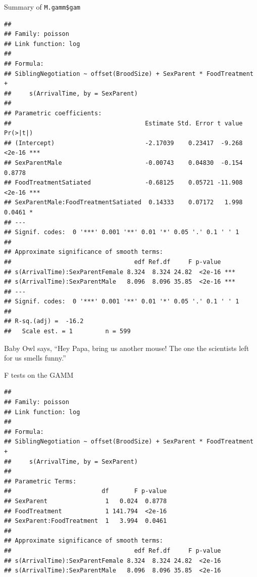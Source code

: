 \documentclass[
  ignorenonframetext,
]{beamer}
\newenvironment{Shaded}{\begin{snugshade}}{\end{snugshade}}
\newcommand{\FunctionTok}[1]{\textcolor[rgb]{0.00,0.00,0.00}{#1}}
\newcommand{\NormalTok}[1]{#1}
\newcommand{\SpecialCharTok}[1]{\textcolor[rgb]{0.00,0.00,0.00}{#1}}
\begin{document}
\begin{frame}[fragile]{Summary of \texttt{M.gamm\$gam}}
\protect\hypertarget{summary-of-m.gammgam}{}
\tiny

\begin{verbatim}
## 
## Family: poisson 
## Link function: log 
## 
## Formula:
## SiblingNegotiation ~ offset(BroodSize) + SexParent * FoodTreatment + 
##     s(ArrivalTime, by = SexParent)
## 
## Parametric coefficients:
##                                     Estimate Std. Error t value Pr(>|t|)    
## (Intercept)                         -2.17039    0.23417  -9.268   <2e-16 ***
## SexParentMale                       -0.00743    0.04830  -0.154   0.8778    
## FoodTreatmentSatiated               -0.68125    0.05721 -11.908   <2e-16 ***
## SexParentMale:FoodTreatmentSatiated  0.14333    0.07172   1.998   0.0461 *  
## ---
## Signif. codes:  0 '***' 0.001 '**' 0.01 '*' 0.05 '.' 0.1 ' ' 1
## 
## Approximate significance of smooth terms:
##                                  edf Ref.df     F p-value    
## s(ArrivalTime):SexParentFemale 8.324  8.324 24.82  <2e-16 ***
## s(ArrivalTime):SexParentMale   8.096  8.096 35.85  <2e-16 ***
## ---
## Signif. codes:  0 '***' 0.001 '**' 0.01 '*' 0.05 '.' 0.1 ' ' 1
## 
## R-sq.(adj) =  -16.2   
##   Scale est. = 1         n = 599
\end{verbatim}

Baby Owl says, ``Hey Papa, bring us another mouse! The one the
scientists left for us smells funny.''
\end{frame}

\begin{frame}[fragile]{F tests on the GAMM}
\protect\hypertarget{f-tests-on-the-gamm}{}
\scriptsize

\begin{Shaded}
\end{Shaded}

\begin{verbatim}
## 
## Family: poisson 
## Link function: log 
## 
## Formula:
## SiblingNegotiation ~ offset(BroodSize) + SexParent * FoodTreatment + 
##     s(ArrivalTime, by = SexParent)
## 
## Parametric Terms:
##                         df       F p-value
## SexParent                1   0.024  0.8778
## FoodTreatment            1 141.794  <2e-16
## SexParent:FoodTreatment  1   3.994  0.0461
## 
## Approximate significance of smooth terms:
##                                  edf Ref.df     F p-value
## s(ArrivalTime):SexParentFemale 8.324  8.324 24.82  <2e-16
## s(ArrivalTime):SexParentMale   8.096  8.096 35.85  <2e-16
\end{verbatim}
\end{frame}
\end{document}
